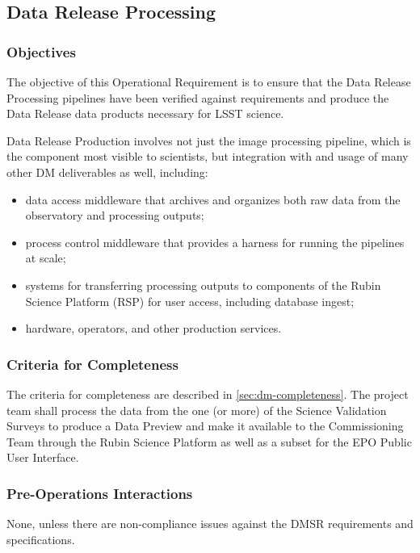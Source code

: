 \subsection{Data Release Processing}

\subsubsection{Objectives}
The objective of this Operational Requirement is to ensure that the Data Release Processing pipelines have been verified against requirements  and produce the Data Release data products necessary for LSST science.

Data Release Production involves not just the image processing pipeline,  which is the component most visible to scientists, but integration with and usage of many other DM deliverables as well, including:
\begin{itemize}
\item data access middleware that archives and organizes both raw data from the observatory and processing outputs;
\item process control middleware that provides a harness for running the pipelines at scale;
\item systems for transferring processing outputs to components of the Rubin Science Platform (RSP) for user access, including database ingest;
\item hardware, operators, and other production services.
\end{itemize}

\subsubsection{Criteria for Completeness}
The criteria for completeness are described in \ref{sec:dm-completeness}.
The project team shall process the data from the one (or more) of the Science Validation Surveys to produce a Data Preview and make it available to the Commissioning Team through the Rubin Science Platform as well as a subset for the EPO Public User Interface.

\subsubsection{Pre-Operations Interactions}
None, unless there are non-compliance issues against the DMSR requirements and specifications.

